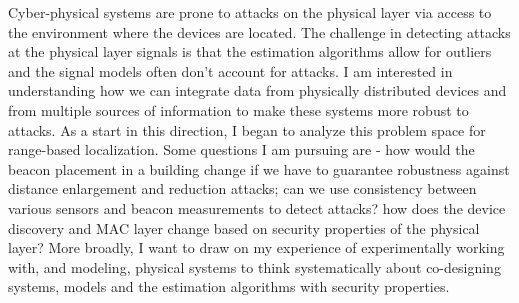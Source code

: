 \documentclass[10pt]{article}
\begin{document}
Cyber-physical systems are prone to attacks on the physical layer via
access to the environment where the devices are located.  The challenge in detecting attacks at the physical layer signals is that %
the estimation algorithms allow for
outliers and the signal models often don't
account for attacks. 
I am interested in understanding how we can integrate
data from physically distributed devices and from multiple sources of
information to make these systems more robust to attacks. As a start
in this direction, I began to analyze this problem space for
range-based localization. %
Some questions I
am pursuing are - how would the beacon placement in a building change
if we have to guarantee robustness against distance enlargement and reduction attacks; can we use
consistency between various sensors and beacon measurements to detect attacks? 
how does the device discovery and MAC layer change based on security
properties of the physical layer? More broadly, I want to draw on my experience of experimentally
working with, and modeling, physical systems to think systematically
about co-designing systems, models and the estimation algorithms with security properties. %

\end{document}
